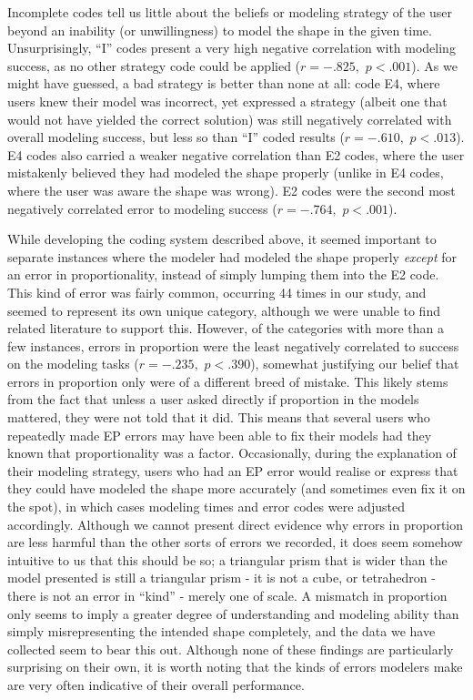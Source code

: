 Incomplete codes tell us little about the beliefs or modeling strategy of the
user beyond an inability (or unwillingness) to model the shape in the given
time. Unsurprisingly, ``I'' codes present a very high negative correlation with
modeling success, as no other strategy code could be applied ($r=-.825,$ $p <
.001$). As we might have guessed, a bad strategy is better than none at all:
code E4, where users knew their model was incorrect, yet expressed a strategy
(albeit one that would not have yielded the correct solution) was still
negatively correlated with overall modeling success, but less so than ``I''
coded results ($r=-.610,$ $p <.013$). E4 codes also carried a weaker negative
correlation than E2 codes, where the user mistakenly believed they had modeled
the shape properly (unlike in E4 codes, where the user was aware the shape was
wrong). E2 codes were the second most negatively correlated error to modeling
success ($r=-.764,$ $p < .001$).

While developing the coding system described above, it seemed important to
separate instances where the modeler had modeled the shape properly
\emph{except} for an error in proportionality, instead of simply lumping them
into the E2 code. This kind of error was fairly common, occurring 44 times in
our study, and seemed to represent its own unique category, although we were
unable to find related literature to support this. However, of the categories
with more than a few instances, errors in proportion were the least negatively
correlated to success on the modeling tasks ($r=-.235,$ $p < .390$), somewhat
justifying our belief that errors in proportion only were of a different breed
of mistake. This likely stems from the fact that unless a user asked directly if
proportion in the models mattered, they were not told that it did.
This means that several users who repeatedly made EP errors may have been able
to fix their models had they known that proportionality was a factor.
Occasionally, during the explanation of their modeling strategy, users who had
an EP error would realise or express that they could have modeled the shape more
accurately (and sometimes even fix it on the spot), in which cases modeling
times and error codes were adjusted accordingly. Although we cannot present
direct evidence why errors in proportion are less harmful than the other sorts
of errors we recorded, it does seem somehow intuitive to us that this should be
so; a triangular prism that is wider than the model presented is still a
triangular prism - it is not a cube, or tetrahedron - there is not an error in
``kind'' - merely one of scale. A mismatch in proportion only seems to imply a
greater degree of understanding and modeling ability than simply misrepresenting
the intended shape completely, and the data we have collected seem to bear
this out. Although none of these findings are particularly surprising on their own,
it is worth noting that the kinds of errors modelers make are very often
indicative of their overall performance.

